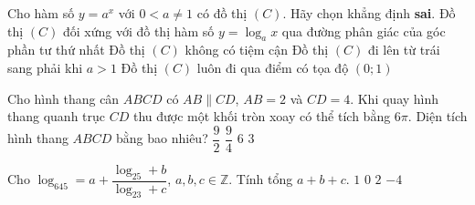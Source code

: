 \begin{ex}%
		Cho hàm số $y=a^x$ với $0<a\ne 1$ có đồ thị $(C)$. Hãy chọn khẳng định \textbf{sai}.
		\choice
		{Đồ thị $(C)$ đối xứng với đồ thị hàm số $y=\log_ax$ qua đường phân giác của góc phần tư thứ nhất}
		{\True Đồ thị $(C)$ không có tiệm cận}
		{Đồ thị $(C)$ đi lên từ trái sang phải khi $a>1$}
		{Đồ thị $(C)$ luôn đi qua điểm có tọa độ $\left(0;1\right)$}
	\end{ex}
\begin{ex}%
		Cho hình thang cân $ABCD$ có $AB\parallel CD$, $AB=2$ và $CD=4$. Khi quay hình thang quanh trục $CD$ thu được một khối tròn xoay có thể tích bằng $6\pi$. Diện tích hình thang $ABCD$ bằng bao nhiêu?
		\choice
		{\True $\dfrac{9}{2}$}
		{$\dfrac{9}{4}$}
		{$6$}
		{$3$}
	\end{ex}
\begin{ex}%
		Cho $\log_645=a+\dfrac{\log_25+b}{\log_23+c}$, $a,b,c\in \mathbb{Z}$. Tính tổng $a+b+c$.
		\choice
		{\True $1$}
		{$0$}
		{$2$}
		{$-4$}
	\end{ex}

